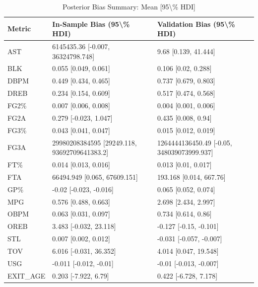 \begin{table}[t]
\caption*{
{\fontsize{20}{25}\selectfont  Posterior Bias Summary: Mean [95\textbackslash{}\% HDI]\fontsize{12}{15}\selectfont }
} 
\fontsize{12.0pt}{14.0pt}\selectfont
\begin{tabular*}{\linewidth}{@{\extracolsep{\fill}}lll}
\toprule
Metric & In-Sample Bias (95\textbackslash{}\% HDI) & Validation Bias (95\textbackslash{}\% HDI) \\ 
\midrule\addlinespace[2.5pt]
AST & 6145435.36 [-0.007, 36324798.748] & 9.68 [0.139, 41.444] \\ 
BLK & 0.055 [0.049, 0.061] & 0.106 [0.02, 0.288] \\ 
DBPM & 0.449 [0.434, 0.465] & 0.737 [0.679, 0.803] \\ 
DREB & 0.234 [0.154, 0.609] & 0.517 [0.474, 0.568] \\ 
FG2\% & 0.007 [0.006, 0.008] & 0.004 [0.001, 0.006] \\ 
FG2A & 0.279 [-0.023, 1.047] & 0.435 [0.008, 0.94] \\ 
FG3\% & 0.043 [0.041, 0.047] & 0.015 [0.012, 0.019] \\ 
FG3A & 29980208384595 [29249.118, 93692709641383.2] & 1264444136450.49 [-0.05, 348039073999.937] \\ 
FT\% & 0.014 [0.013, 0.016] & 0.013 [0.01, 0.017] \\ 
FTA & 66494.949 [0.065, 67609.151] & 193.168 [0.014, 667.76] \\ 
GP\% & -0.02 [-0.023, -0.016] & 0.065 [0.052, 0.074] \\ 
MPG & 0.576 [0.488, 0.663] & 2.698 [2.434, 2.997] \\ 
OBPM & 0.063 [0.031, 0.097] & 0.734 [0.614, 0.86] \\ 
OREB & 3.483 [-0.032, 23.118] & -0.127 [-0.15, -0.101] \\ 
STL & 0.007 [0.002, 0.012] & -0.031 [-0.057, -0.007] \\ 
TOV & 6.016 [-0.031, 36.352] & 4.014 [0.047, 19.548] \\ 
USG & -0.011 [-0.012, -0.01] & -0.01 [-0.013, -0.007] \\ 
EXIT\_AGE & 0.203 [-7.922, 6.79] & 0.422 [-6.728, 7.178] \\ 
\bottomrule
\end{tabular*}
\end{table}

